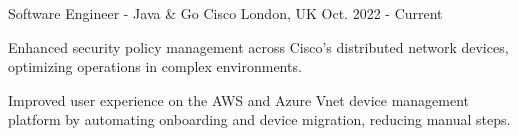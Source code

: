 

\begin{cventries}


\cventry
    {Software Engineer - Java \& Go} %
    {Cisco} %
    {London, UK} %
    {Oct. 2022 - Current} %
    {
      \begin{cvitems}
        \item {Enhanced security policy management across Cisco's distributed network devices, optimizing operations in complex environments.}
        \item {Improved user experience on the AWS and Azure Vnet device management platform by automating onboarding and device migration, reducing manual steps.}

\end{cvitems}}
\end{cventries}
